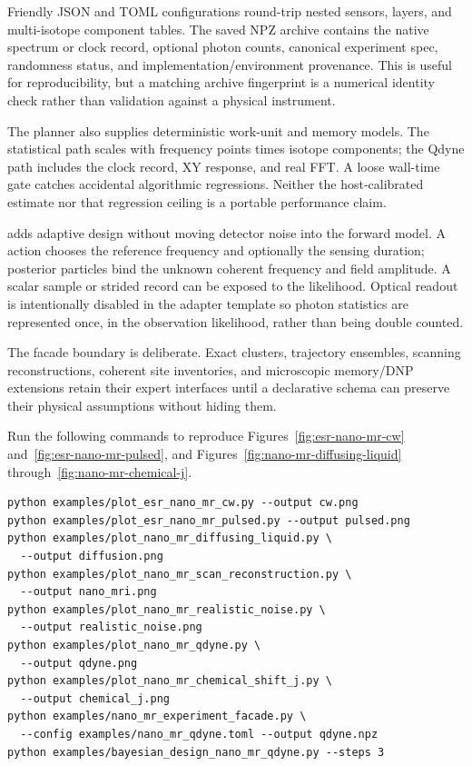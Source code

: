 Friendly JSON and TOML configurations round-trip nested sensors, layers, and
multi-isotope component tables. The saved NPZ archive contains the native
spectrum or clock record, optional photon counts, canonical experiment spec,
randomness status, and implementation/environment provenance. This is useful
for reproducibility, but a matching archive fingerprint is a numerical
identity check rather than validation against a physical instrument.

The planner also supplies deterministic work-unit and memory models. The
statistical path scales with frequency points times isotope components; the
Qdyne path includes the clock record, XY response, and real FFT. A loose
wall-time gate catches accidental algorithmic regressions. Neither the
host-calibrated estimate nor that regression ceiling is a portable performance
claim.

 adds adaptive design without moving detector noise
into the forward model. A  action chooses the reference
frequency and optionally the sensing duration; posterior particles bind the
unknown coherent frequency and field amplitude. A scalar sample or strided
record can be exposed to the likelihood. Optical readout is intentionally
disabled in the adapter template so photon statistics are represented once,
in the observation likelihood, rather than being double counted.

The facade boundary is deliberate. Exact clusters, trajectory ensembles,
scanning reconstructions, coherent site inventories, and microscopic
memory/DNP extensions retain their expert 
interfaces until a declarative schema can preserve their physical assumptions
without hiding them.

Run the following commands to reproduce
Figures~\ref{fig:esr-nano-mr-cw}
and~\ref{fig:esr-nano-mr-pulsed}, and
Figures~\ref{fig:nano-mr-diffusing-liquid}
through~\ref{fig:nano-mr-chemical-j}.
\begin{lstlisting}
python examples/plot_esr_nano_mr_cw.py --output cw.png
python examples/plot_esr_nano_mr_pulsed.py --output pulsed.png
python examples/plot_nano_mr_diffusing_liquid.py \
  --output diffusion.png
python examples/plot_nano_mr_scan_reconstruction.py \
  --output nano_mri.png
python examples/plot_nano_mr_realistic_noise.py \
  --output realistic_noise.png
python examples/plot_nano_mr_qdyne.py \
  --output qdyne.png
python examples/plot_nano_mr_chemical_shift_j.py \
  --output chemical_j.png
python examples/nano_mr_experiment_facade.py \
  --config examples/nano_mr_qdyne.toml --output qdyne.npz
python examples/bayesian_design_nano_mr_qdyne.py --steps 3
\end{lstlisting}
